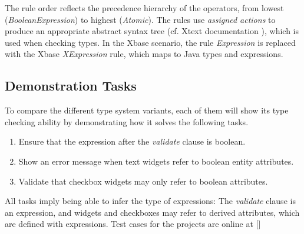 The rule order reflects
the precedence hierarchy of the operators, from lowest
(\emph{BooleanExpression}) to highest (\emph{Atomic}). The rules use
\emph{assigned actions} to produce an appropriate abstract syntax tree (cf.
Xtext documentation \cite{xtextdoc}), which is used when checking types.
In the Xbase scenario, the rule \emph{Expression} is replaced with the Xbase
\emph{XExpression} rule, which maps to Java types and expressions.


\subsection{Demonstration Tasks}
To compare the different type system variants, each of them will show its type
checking ability by demonstrating how it solves the following tasks.
\begin{enumerate}
\item Ensure that the expression after the \emph{validate} clause is boolean.
\item Show an error message when text widgets refer to boolean entity attributes.
\item Validate that checkbox widgets may only refer to boolean attributes.
\end{enumerate}

All tasks imply being able to infer the type of expressions: The \emph{validate}
clause is an expression, and widgets and checkboxes may refer to derived
attributes, which are defined with expressions. Test cases for the projects are
online at []%
